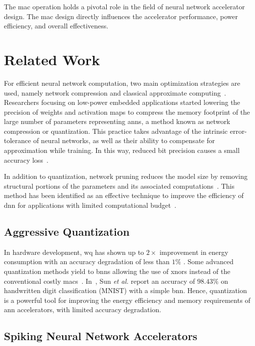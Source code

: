 The \gls{mac} operation holds a pivotal role in the field of neural network accelerator design. The \gls{mac} design directly influences the accelerator performance, power efficiency, and overall effectiveness.



\section{Related Work}
For efficient neural network computation, two main optimization strategies are used, namely network compression and classical approximate computing~\cite{bouvier2019spiking}. Researchers focusing on low-power embedded applications started lowering the precision of weights and activation maps to compress the memory footprint of the large number of parameters representing \glspl{ann}, a method known as network compression or quantization. This practice takes advantage of the intrinsic error-tolerance of neural networks, as well as their ability to compensate for approximation while training. In this way, reduced bit precision causes a small accuracy loss~\cite{courbariaux2015binaryconnect, han2015deep, hubara2017quantized, rastegari2016xnor}.


In addition to quantization, network pruning reduces the model size by removing structural portions of the parameters and its associated computations~\cite{lecun1989optimal,hassibi1992second}. This method has been identified as an effective technique to improve the efficiency of \gls{dnn} for applications with limited computational budget~\cite{molchanov2016pruning,li2016pruning, liu2018rethinking}.


\subsection{Aggressive Quantization}
In hardware development, \gls{wq} has shown up to $2\times$ improvement in energy consumption with an accuracy degradation of less than $1\%$ \cite{moons20160, whatmough201714}. Some advanced quantization methods yield to \glspl{bnn} allowing the use of \glspl{xnor} instead of the conventional costly \glspl{mac}~\cite{rastegari2016xnor}. In~\cite{sun2018xnor}, Sun \textit{et al.} report an accuracy of $98.43\%$ on handwritten digit classification (MNIST) with a simple \gls{bnn}. Hence, quantization is a powerful tool for improving the energy efficiency and memory requirements of \gls{ann} accelerators, with limited accuracy degradation.

\subsection{Spiking Neural Network Accelerators}

